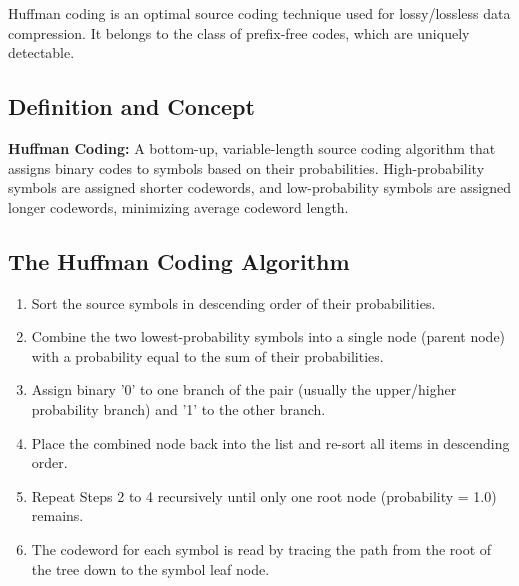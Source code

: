 \documentclass[12pt,a4paper]{article}
\begin{document}
Huffman coding is an optimal source coding technique used for lossy/lossless data compression. It belongs to the class of prefix-free codes, which are uniquely detectable.

\subsection{Definition and Concept}
\begin{tcolorbox}[defbox]
\textbf{Huffman Coding:} A bottom-up, variable-length source coding algorithm that assigns binary codes to symbols based on their probabilities. High-probability symbols are assigned shorter codewords, and low-probability symbols are assigned longer codewords, minimizing average codeword length.
\end{tcolorbox}

\subsection{The Huffman Coding Algorithm}
\begin{enumerate}[label=\textbf{Step \arabic*:}, leftmargin=4.5em, itemsep=3.5pt]
  \item Sort the source symbols in descending order of their probabilities.
  \item Combine the two lowest-probability symbols into a single node (parent node) with a probability equal to the sum of their probabilities.
  \item Assign binary '0' to one branch of the pair (usually the upper/higher probability branch) and '1' to the other branch.
  \item Place the combined node back into the list and re-sort all items in descending order.
  \item Repeat Steps 2 to 4 recursively until only one root node (probability = 1.0) remains.
  \item The codeword for each symbol is read by tracing the path from the root of the tree down to the symbol leaf node.
\end{enumerate}
\end{document}
